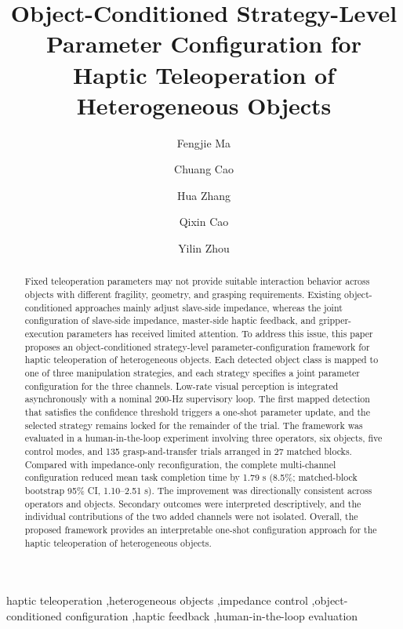 \documentclass[5p,times]{elsarticle}
\begin{document}
\begin{frontmatter}
\title{Object-Conditioned Strategy-Level Parameter Configuration for Haptic Teleoperation of Heterogeneous Objects}

\author[a]{Fengjie Ma}
\author[b]{Chuang Cao}
\author[a]{Hua Zhang}
\author[b]{Qixin Cao}
\author[a]{Yilin Zhou}


\begin{abstract}
Fixed teleoperation parameters may not provide suitable interaction behavior across objects with different fragility, geometry, and grasping requirements. Existing object-conditioned approaches mainly adjust slave-side impedance, whereas the joint configuration of slave-side impedance, master-side haptic feedback, and gripper-execution parameters has received limited attention. To address this issue, this paper proposes an object-conditioned strategy-level parameter-configuration framework for haptic teleoperation of heterogeneous objects. Each detected object class is mapped to one of three manipulation strategies, and each strategy specifies a joint parameter configuration for the three channels. Low-rate visual perception is integrated asynchronously with a nominal 200-Hz supervisory loop. The first mapped detection that satisfies the confidence threshold triggers a one-shot parameter update, and the selected strategy remains locked for the remainder of the trial. The framework was evaluated in a human-in-the-loop experiment involving three operators, six objects, five control modes, and 135 grasp-and-transfer trials arranged in 27 matched blocks. Compared with impedance-only reconfiguration, the complete multi-channel configuration reduced mean task completion time by 1.79 s (8.5\%; matched-block bootstrap 95\% CI, 1.10--2.51 s). The improvement was directionally consistent across operators and objects. Secondary outcomes were interpreted descriptively, and the individual contributions of the two added channels were not isolated. Overall, the proposed framework provides an interpretable one-shot configuration approach for the haptic teleoperation of heterogeneous objects.
\end{abstract}

\begin{keyword}
haptic teleoperation \sep heterogeneous objects \sep impedance control \sep object-conditioned configuration \sep haptic feedback \sep human-in-the-loop evaluation
\end{keyword}
\end{frontmatter}












\end{document}
